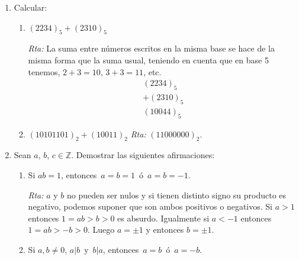\documentclass[12pt,spanish,makeidx]{amsbook}
\newcommand{\rta}{\noindent\textit{Rta: }}
\begin{document}
\begin{enumerate}
\begin{enumerate}
	Hay una forma de hacer este ejercicio más corta: observar que $1280 = 2^7\times 10 = 2^8\times 5 = 2^8\times (2^2 +1) = 2^{10} + 2^8$. 
	\item
	$(1541)_6$ a base 4. 
	
	 \rta  $6^3+5\times 6^2+4\times 6+1=54\times 4+45\times 4+6\times 4=105\times 4=420$. Luego,
	 \begin{align*}
	 	420 &= 4 \times 105 + 0 \\
	 	105 &= 4 \times 26 +1 \\
	 	26 &= 4 \times 6 +2 \\
	 	6 &= 4 \times 1 +2 \\
	 	1 &= 4 \times 0 +1.
	 \end{align*}
	 Entonces, $(1541)_6=(12210)_4$.
\end{enumerate}


\smallskip

\item Calcular: 
\begin{enumerate} 
	\item
	$(2234)_5 + (2310)_5$  
	
	\rta La suma entre números escritos en la misma base se hace de la misma forma que la suma usual, teniendo en cuenta que en base 5 tenemos, $2+3 = 10$, $3+3 = 11$, etc.
	\begin{equation*}
		\begin{array}{r}
		(2234)_5 \\
		+(2310)_5 \\
		\hline 
		(10044)_5
		\end{array}
	\end{equation*}
	

	\item
	$(10101101)_2 + (10011)_2$  \rta  $(11000000)_2$.
\end{enumerate}
\smallskip

\item Sean $a$, $b$, $c \in {\mathbb Z}$. Demostrar las siguientes afirmaciones:
\begin{enumerate}
	\item Si $ab=1$, entonces \,$a=b=1$\, \'o \,$a=b=-1$.
	
	\rta  $a$ y $b$ no pueden ser nulos y si tienen distinto signo su producto es negativo, podemos suponer que son ambos positivos o negativos. Si $a>1$ entonces $1=ab>b>0$ es absurdo. Igualmente si $a<-1$ entonces $1=ab >-b>0$. Luego $a=\pm1$ y entonces $b=\pm1$.
	
	\item Si $a,b \neq 0$,  $a| b$\, y \,$b | a$, entonces \,$a=b$\, \'o \,$a=-b$.
	

\end{enumerate}
\end{enumerate}
\end{document}
